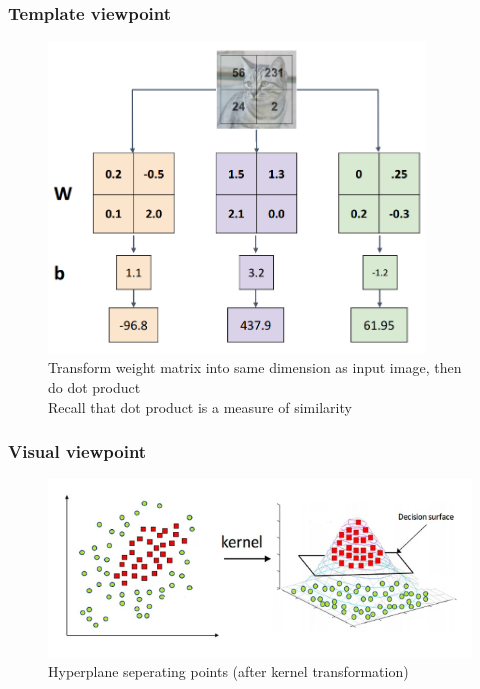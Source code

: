 \documentclass{article}
\begin{document}
\subsubsection{Template viewpoint}
\begin{figure}[htp]
    \centering
    \includegraphics[width=10cm, scale=1]{images/templateViewpoint.PNG}
    \captionsetup{justification=centering}
    \caption{Transform weight matrix into same dimension as input image, then do dot product\\
                Recall that dot product is a measure of similarity}
\end{figure}

\newpage
\subsubsection{Visual viewpoint}
\begin{figure}[htp]
    \centering
    \includegraphics[width=12cm, scale=1]{images/visualViewpoint.png}
    \caption{Hyperplane seperating points (after kernel transformation)}
\end{figure}
\end{document}
